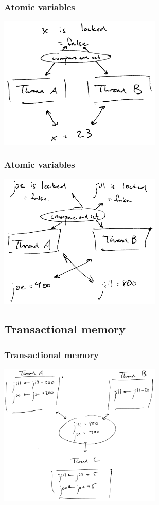 \documentclass[aspectratio=1610]{beamer}
\begin{document}
  \begin{frame}
    \frametitle{Atomic variables}
    \centering

    \includegraphics[width=220pt]{../figures/lock}
  \end{frame}

  \begin{frame}
    \frametitle{Atomic variables}
    \centering

    \includegraphics[width=220pt]{../figures/multiple-locks}
  \end{frame}

  \subsection{Transactional memory}

  \begin{frame}
    \frametitle{Transactional memory}
    \centering

    \includegraphics[width=220pt]{../figures/stm}
  \end{frame}
\end{document}
